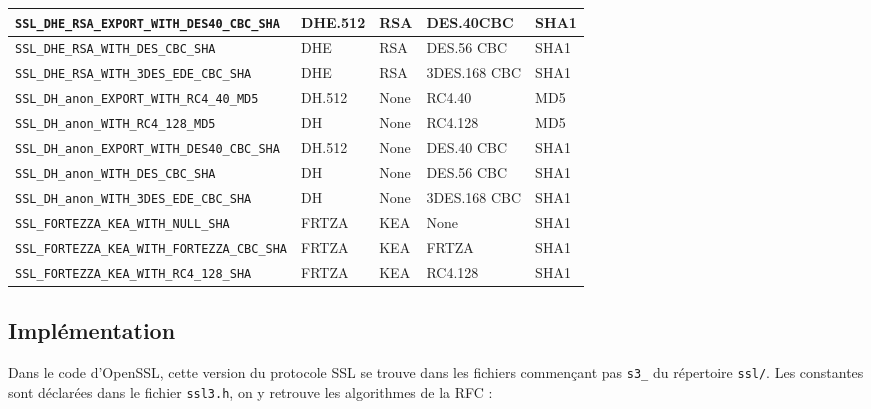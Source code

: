 \documentclass[a4paper,11pt,french]{article}
\begin{document}
\begin{center}
\begin{tabularx}{17cm}{|l|l|l|X|l|}
\hline
\verb+SSL_DHE_RSA_EXPORT_WITH_DES40_CBC_SHA+ & DHE.512&RSA&DES.40CBC&SHA1\\
\hline
\verb+SSL_DHE_RSA_WITH_DES_CBC_SHA+ & DHE&RSA&DES.56 CBC&SHA1\\
\hline
\verb+SSL_DHE_RSA_WITH_3DES_EDE_CBC_SHA+ & DHE&RSA&3DES.168 CBC&SHA1\\
\hline 
\verb+SSL_DH_anon_EXPORT_WITH_RC4_40_MD5+ & DH.512&None&RC4.40&MD5\\
\hline
\verb+SSL_DH_anon_WITH_RC4_128_MD5+ & DH&None&RC4.128&MD5\\
\hline
\verb+SSL_DH_anon_EXPORT_WITH_DES40_CBC_SHA+ & DH.512&None&DES.40 CBC&SHA1\\
\hline
\verb+SSL_DH_anon_WITH_DES_CBC_SHA+& DH	&None	&DES.56	CBC&SHA1\\
\hline
\verb+SSL_DH_anon_WITH_3DES_EDE_CBC_SHA+ & DH	&None	&3DES.168 CBC&	SHA1\\
\hline
\verb+SSL_FORTEZZA_KEA_WITH_NULL_SHA+ & FRTZA&	KEA&	None&	SHA1\\
\hline
\verb+SSL_FORTEZZA_KEA_WITH_FORTEZZA_CBC_SHA+ & FRTZA & KEA & FRTZA& SHA1\\
\hline
\verb+SSL_FORTEZZA_KEA_WITH_RC4_128_SHA+ & FRTZA	&KEA&	RC4.128	&SHA1\\
\hline
\end{tabularx}
\end{center}


\subsection{Implémentation}

Dans le code d'OpenSSL, cette version du protocole SSL se trouve dans les fichiers commençant pas \verb+s3_+ du répertoire \verb+ssl/+. Les constantes sont déclarées dans le fichier \verb+ssl3.h+, on y retrouve les algorithmes de la RFC :
\end{document}

